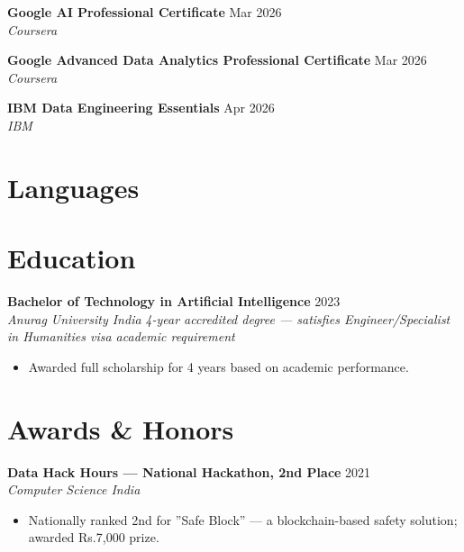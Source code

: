 \documentclass[10pt,letterpaper]{article}
\newcommand{\entry}[3]{%
  \vspace{3pt}\textbf{#1} \hfill #3 \\
  \textit{\small #2}\vspace{1pt}}
\begin{document}
\textbf{Google AI Professional Certificate} \hfill Mar 2026 \\
\textit{Coursera}

\textbf{Google Advanced Data Analytics Professional Certificate} \hfill Mar 2026 \\
\textit{Coursera}

\textbf{IBM Data Engineering Essentials} \hfill Apr 2026 \\
\textit{IBM}

\section{Languages}


\section{Education}

\entry{Bachelor of Technology in Artificial Intelligence}{Anurag University \textbullet{} India}{2023}
\newline\textit{\small 4-year accredited degree --- satisfies Engineer/Specialist in Humanities visa academic requirement}
\begin{itemize}
  \item Awarded full scholarship for 4 years based on academic performance.
\end{itemize}

\section{Awards \& Honors}

\textbf{Data Hack Hours --- National Hackathon, 2nd Place} \hfill 2021 \\
\textit{Computer Science India}
\begin{itemize}
  \item Nationally ranked 2nd for ''Safe Block'' --- a blockchain-based safety solution; awarded Rs.7,000 prize.
\end{itemize}
\end{document}
